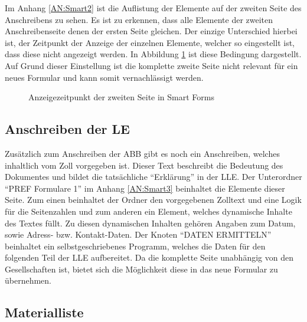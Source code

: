 	Im Anhang \ref{AN:Smart2} ist die Auflistung der Elemente auf der zweiten Seite des Anschreibens zu sehen. Es ist zu erkennen, dass alle Elemente der zweiten Anschreibenseite denen der ersten Seite gleichen. Der einzige Unterschied hierbei ist, der Zeitpunkt der Anzeige der einzelnen Elemente, welcher so eingestellt ist, dass diese nicht angezeigt werden. In Abbildung \ref{beding_smart} ist diese Bedingung dargestellt. Auf Grund dieser Einstellung ist die komplette zweite Seite nicht relevant für ein neues Formular und kann somit vernachlässigt werden.
	
	\begin{figure}[ht]
		\centering
		\caption{Anzeigezeitpunkt der zweiten Seite in Smart Forms}
		\label{beding_smart}
	\end{figure}
	
	\subsection{Anschreiben der \acs{LE}}
	\label{ist:le}
	
	Zusätzlich zum Anschreiben der ABB gibt es noch ein Anschreiben, welches inhaltlich vom Zoll vorgegeben ist. Dieser Text beschreibt die Bedeutung des Dokumentes und bildet die tatsächliche "`Erklärung"' in der \ac{LLE}. Der Unterordner "`PREF Formulare 1"' im Anhang \ref{AN:Smart3} beinhaltet die Elemente dieser Seite. Zum einen beinhaltet der Ordner den vorgegebenen Zolltext und eine Logik für die Seitenzahlen und zum anderen ein Element, welches dynamische Inhalte des Textes füllt. Zu diesen dynamischen Inhalten gehören Angaben zum Datum, sowie Adress- bzw. Kontakt-Daten. Der Knoten "`DATEN ERMITTELN"' beinhaltet ein selbstgeschriebenes Programm, welches die Daten für den folgenden Teil der \ac{LLE} aufbereitet. Da die komplette Seite unabhängig von den Gesellschaften ist, bietet sich die Möglichkeit diese in das neue Formular zu übernehmen. 
	
	\subsection{Materialliste}
	
